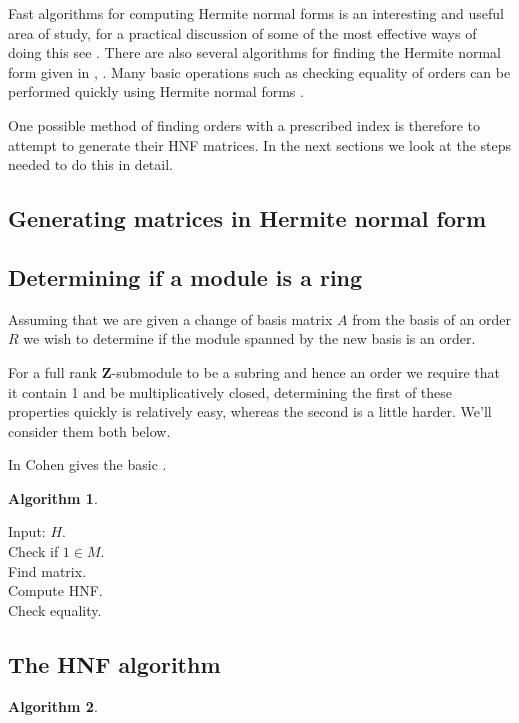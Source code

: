 \documentclass[12pt,a4paper,abstracton,bibtotoc]{scrreprt}
\theoremstyle{definition}
\newtheorem{alg}{Algorithm}
\newcommand{\ZZ}{\mathbf{Z}}
\begin{document}
Fast algorithms for computing Hermite normal forms is an interesting and useful area of study, for a practical discussion of some of the most effective ways of doing this see \cite{pernetstein}.
There are also several algorithms for finding the Hermite normal form given in \cite{cohen93}, . %
Many basic operations such as checking equality of orders can be performed quickly using Hermite normal forms \cite{cohen93}.  %

One possible method of finding orders with a prescribed index is therefore to attempt to generate their HNF matrices.
In the next sections we look at the steps needed to do this in detail.

\subsection{Generating matrices in Hermite normal form}


\subsection{Determining if a module is a ring}
Assuming that we are given a change of basis matrix $A$ from the basis of an order $R$ we wish to determine if the module spanned by the new basis is an order.

For a full rank $\ZZ$-submodule to be a subring and hence an order we require that it contain 1 and be multiplicatively closed, determining the first of these properties quickly is relatively easy, whereas the second is a little harder.
We'll consider them both below.



In \cite{cohen93} Cohen gives the basic . %

\begin{alg} 
\begin{algorithm}[H]
\label{alg:isring}
Input: $H$.\\
Check if $1\in M$.\\
Find matrix.\\
Compute HNF.\\
Check equality.\\
\end{algorithm}
\end{alg} 

\subsection{The HNF algorithm}
\begin{alg}~\\
\begin{algorithm}[H]
\end{algorithm}
\end{alg}
\end{document}
